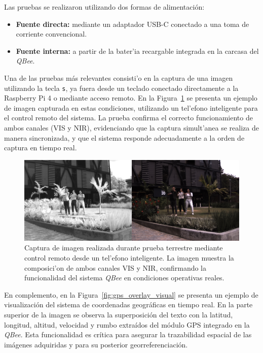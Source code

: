         \noindent Las pruebas se realizaron utilizando dos formas de alimentación:
        \begin{itemize}
        \item \textbf{Fuente directa:} mediante un adaptador USB-C conectado a una toma de corriente convencional.
        \item \textbf{Fuente interna:} a partir de la bater'ia recargable integrada en la carcasa del \textit{QBee}.
        \end{itemize}
        
        \noindent Una de las pruebas más relevantes consisti'o en la captura de una imagen utilizando la tecla \texttt{s}, ya fuera desde un teclado conectado directamente a la Raspberry Pi 4 o mediante acceso remoto. En la Figura~\ref{fig:captura_prueba_remota} se presenta un ejemplo de imagen capturada en estas condiciones, utilizando un tel'efono inteligente para el control remoto del sistema. La prueba confirma el correcto funcionamiento de ambos canales (VIS y NIR), evidenciando que la captura simult'anea se realiza de manera sincronizada, y que el sistema responde adecuadamente a la orden de captura en tiempo real.
        
        \begin{figure}[h]
        \centering
        \includegraphics[width=1\textwidth]{Figures/C4/captured_image_20240201_174102.jpg}
        \caption{Captura de imagen realizada durante prueba terrestre mediante control remoto desde un tel'efono inteligente. La imagen muestra la composici'on de ambos canales VIS y NIR, confirmando la funcionalidad del sistema \textit{QBee} en condiciones operativas reales.}
        \label{fig:captura_prueba_remota}
        \end{figure}
        
        \noindent En complemento, en la Figura~\ref{fig:gps_overlay_visual} se presenta un ejemplo de visualización del sistema de coordenadas geográficas en tiempo real. En la parte superior de la imagen se observa la superposición del texto con la latitud, longitud, altitud, velocidad y rumbo extraídos del módulo GPS integrado en la \textit{QBee}. Esta funcionalidad es crítica para asegurar la trazabilidad espacial de las imágenes adquiridas y para su posterior georreferenciación.

